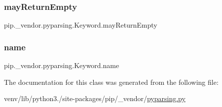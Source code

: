 \subsubsection{\texorpdfstring{may\+Return\+Empty}{mayReturnEmpty}}
{\footnotesize\ttfamily pip.\+\_\+vendor.\+pyparsing.\+Keyword.\+may\+Return\+Empty}

\mbox{\label{classpip_1_1__vendor_1_1pyparsing_1_1Keyword_a4b49e207dfefb0a086190a9ced77a9fb}} 
\subsubsection{\texorpdfstring{name}{name}}
{\footnotesize\ttfamily pip.\+\_\+vendor.\+pyparsing.\+Keyword.\+name}



The documentation for this class was generated from the following file\+:\begin{DoxyCompactItemize}
\item 
venv/lib/python3./site-\/packages/pip/\+\_\+vendor/\hyperlink{pip_2__vendor_2pyparsing_8py}{pyparsing.\+py}\end{DoxyCompactItemize}
